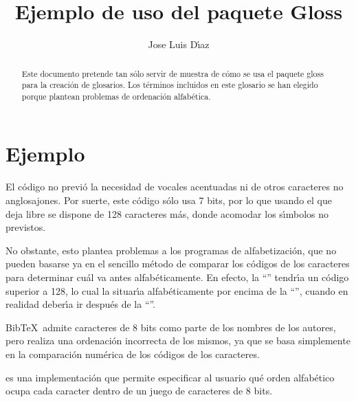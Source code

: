 \documentclass[a4paper,spanish]{article}
\title{Ejemplo de uso del paquete \textsf{Gloss}}
\author{Jose Luis D\'{\i}az}
\begin{document}
\maketitle
\begin{abstract}
  Este documento pretende tan s\'olo servir de muestra de c\'omo se usa el
  paquete \textsf{gloss} para la creaci\'on de glosarios. Los t\'erminos
  incluidos en este glosario se han elegido porque plantean problemas
  de ordenaci\'on alfab\'etica.
\end{abstract}

\section{Ejemplo}

El c\'odigo  no previ\'o la  
necesidad de vocales acentuadas ni de otros caracteres no 
anglosajones.  Por suerte, este c\'odigo s\'olo usa 7 
bits, por lo que usando el  que deja 
libre se dispone de 128 caracteres m\'as, donde acomodar los 
s\'{\i}mbolos no previstos.

No obstante, esto plantea problemas a los programas de 
alfabetizaci\'on, que no pueden basarse ya en el sencillo m\'etodo de 
comparar los c\'odigos de los caracteres para determinar cu\'al va 
antes alfab\'eticamente.  En efecto, la ``'' tendr\'{\i}a 
un c\'odigo superior a 128, lo cual la situar\'{\i}a alfab\'eticamente 
por encima de la ``'', cuando en realidad deber\'{\i}a ir 
despu\'es de la ``''.

Bib\TeX\ admite caracteres de 8 bits como parte de los nombres de los 
autores, pero realiza una ordenaci\'on incorrecta de los mismos, ya 
que se basa simplemente en la comparaci\'on num\'erica de los 
c\'odigos de los caracteres.

 es una implementaci\'on que permite especificar 
al usuario qu\'e orden alfab\'etico ocupa cada caracter dentro de un 
juego de caracteres de 8 bits.

\sloppy

\end{document}
